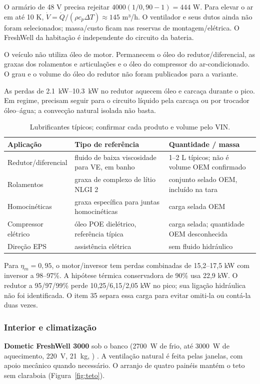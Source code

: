 \documentclass[12pt,a4paper]{article}
\newcommand{\designsec}[1]{\FloatBarrier\Needspace{5\baselineskip}\subsubsection{#1}}
\newcommand{\itemmark}[1]{\label{item:#1}}
\begin{document}
O armário de 48 V precisa rejeitar $4000(1/0{,}90-1)=444$ W.
Para elevar o ar em até 10 K, $\dot V=\dot Q/(\rho c_p\Delta T)\approx145$ m³/h.
O ventilador e seus dutos ainda não foram selecionados; massa/custo ficam nas reservas
de montagem/elétrica. O FreshWell da habitação é independente do circuito da bateria.

\itemmark{12}
O veículo não utiliza óleo de motor. Permanecem o óleo do redutor/diferencial,
as graxas dos rolamentos e articulações e o óleo do compressor do ar-condicionado.
O grau e o volume do óleo do redutor não foram publicados para a variante.

As perdas de \SIrange{2,1}{10,3}{kW} no redutor aquecem óleo e carcaça durante o pico.
Em regime, precisam seguir para o circuito líquido pela carcaça ou por trocador
óleo--água; a convecção natural isolada não basta.


\begin{table}[htbp]\centering\small
\caption{Lubrificantes típicos; confirmar cada produto e volume pelo VIN.}
\begin{tabularx}{\linewidth}{lXX}
\toprule Aplicação & Tipo de referência & Quantidade / massa \\\midrule
Redutor/diferencial & fluido de baixa viscosidade para VE, em banho & 1--2 L típicos; não é volume OEM confirmado \\
Rolamentos & graxa de complexo de lítio NLGI 2 & conjunto selado OEM, incluído na tara \\
Homocinéticas & graxa específica para juntas homocinéticas & carga selada OEM \\
Compressor elétrico & óleo POE dielétrico, referência típica & carga selada; quantidade OEM desconhecida \\
Direção EPS & assistência elétrica & sem fluido hidráulico \\\bottomrule
\end{tabularx}\end{table}
Para $\eta_m=0{,}95$, o motor/inversor tem perdas combinadas de 15,2--17,5 kW
com inversor a 98--97\%. A hipótese térmica conservadora de 90\% usa 22,9 kW.
O redutor a 95/97/99\% perde 10,25/6,15/2,05 kW no pico; sua ligação hidráulica
não foi identificada. O item 35 separa essa carga para evitar omiti-la ou contá-la duas vezes.

\designsec{Interior e climatização}
\itemmark{11}
\textbf{Dometic FreshWell 3000} sob o banco (\SI{2700}{W} de frio, até \SI{3000}{W} de
aquecimento, \SI{220}{V}, \SI{21}{kg}, )
\cite{dometic}. A ventilação natural é feita pelas janelas, com apoio mecânico quando necessário. O arranjo de quatro painéis mantém o teto sem claraboia (Figura~\ref{fig:teto}).
\end{document}
